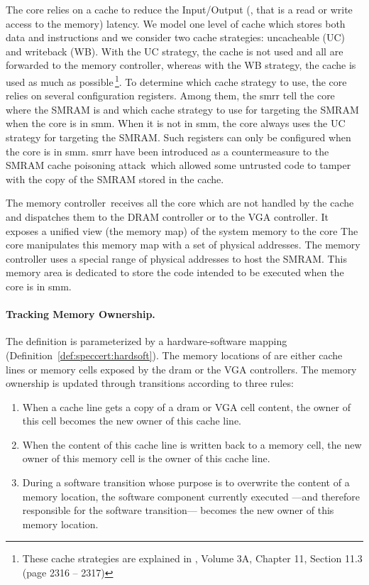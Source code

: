 The core relies on a cache to reduce the Input/Output (\IO, that is a read or
write access to the memory) latency.
%
We model one level of cache which stores both data and instructions and we
consider two cache strategies: uncacheable (UC) and writeback (WB).
%
With the UC strategy, the cache is not used and all \IOs are forwarded to
the memory controller, whereas with the WB strategy, the cache is used as much
as possible\,\footnote{These cache strategies are explained in
  \cite{intel2014manual}, Volume 3A, Chapter 11, Section 11.3 (page 2316 --
  2317)}.
%
To determine which cache strategy to use, the core relies on several
configuration registers.
%
Among them, the \ac{smrr} tell the core where the SMRAM is and which
cache strategy to use for \IO targeting the SMRAM when the core is in \ac{smm}.
%
When it is not in \ac{smm}, the core always uses the UC strategy for \IO
targeting the SMRAM.
%
Such registers can only be configured when the core is in \ac{smm}.
%
\ac{smrr} have been introduced as a countermeasure to the SMRAM cache poisoning
attack\,\cite{wojtczuk2009smram,duflot2009smram} which allowed some untrusted
code to tamper with the copy of the SMRAM stored in the cache.
%

The memory controller\,\cite{intel2009mch} receives all the core \IOs which are
not handled by the cache and dispatches them to the DRAM controller or to the
VGA controller.
%
It exposes a unified view (the memory map) of the system memory to the core
%
The core manipulates this memory map with a set of physical addresses.
%
The memory controller uses a special range of physical addresses to host the
SMRAM.
%
This memory area is dedicated to store the code intended to be executed when the
core is in \ac{smm}.

\paragraph{Tracking Memory Ownership.}
%
The  definition is parameterized by a hardware-software
mapping  (Definition~\ref{def:speccert:hardsoft}).
%
The memory locations of  are either cache lines or memory
cells exposed by the \ac{dram} or the VGA controllers.
%
The memory ownership is updated through transitions according to three rules:
%
\begin{enumerate}
\item When a cache line gets a copy of a \ac{dram} or VGA cell content, the
  owner of this cell becomes the new owner of this cache line.
%
\item When the content of this cache line is written back to a memory cell, the
  new owner of this memory cell is the owner of this cache line.
%
\item During a software transition whose purpose is to overwrite the content of
  a memory location, the software component currently executed ---and therefore
  responsible for the software transition--- becomes the new owner of this
  memory location.
%
\end{enumerate}


